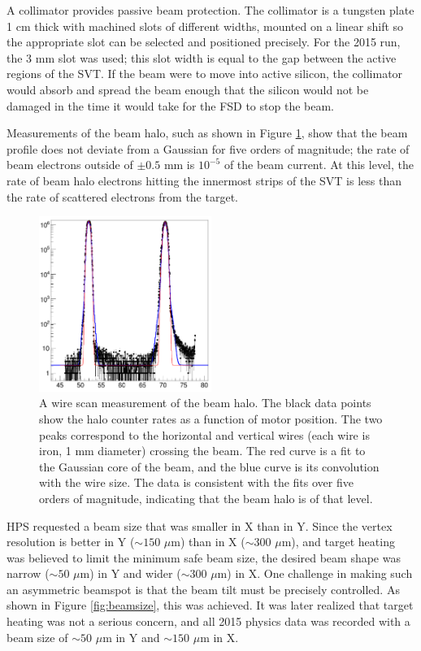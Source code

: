 A collimator provides passive beam protection.
The collimator is a tungsten plate 1 cm thick with machined slots of different widths, mounted on a linear shift so the appropriate slot can be selected and positioned precisely.
For the 2015 run, the 3 mm slot was used; this slot width is equal to the gap between the active regions of the SVT.
If the beam were to move into active silicon, the collimator would absorb and spread the beam enough that the silicon would not be damaged in the time it would take for the FSD to stop the beam.

Measurements of the beam halo, such as shown in Figure \ref{fig:beam-tails}, show that the beam profile does not deviate from a Gaussian for five orders of magnitude; the rate of beam electrons outside of $\pm 0.5$ mm is $10^{-5}$ of the beam current.
At this level, the rate of beam halo electrons hitting the innermost strips of the SVT is less than the rate of scattered electrons from the target.

\begin{figure}[htp]
    \begin{center}
        \includegraphics[width=0.5\textwidth]{detector/figs/beam-tails}
    \end{center}
    \caption{A wire scan measurement of the beam halo.
    The black data points show the halo counter rates as a function of motor position.
    The two peaks correspond to the horizontal and vertical wires (each wire is iron, 1 mm diameter) crossing the beam.
    The red curve is a fit to the Gaussian core of the beam, and the blue curve is its convolution with the wire size.
    The data is consistent with the fits over five orders of magnitude, indicating that the beam halo is of that level.
    }
    \label{fig:beam-tails}
\end{figure}

HPS requested a beam size that was smaller in X than in Y.
Since the vertex resolution is better in Y ($\sim 150$ $\mu$m) than in X ($\sim 300$ $\mu$m), and target heating was believed to limit the minimum safe beam size, the desired beam shape was narrow ($\sim 50$ $\mu$m) in Y and wider ($\sim 300$ $\mu$m) in X.
One challenge in making such an asymmetric beamspot is that the beam tilt must be precisely controlled.
As shown in Figure \ref{fig:beamsize}, this was achieved.
It was later realized that target heating was not a serious concern, and all 2015 physics data was recorded with a beam size of $\sim 50$ $\mu$m in Y and $\sim 150$ $\mu$m in X.

